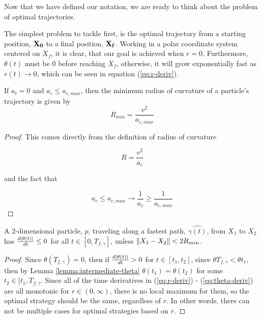 Now that we have defined our notation, we are ready to think about the problem of optimal trajectories.

The simplest problem to tackle first, is the optimal trajectory from a starting position, $\mathbf{X_0}$ to a final position, $\mathbf{X_f}$. Working in a polar coordinate system centered on $X_f$, it is clear, that our goal is achieved when $r = 0$. Furthermore, $\theta(t)$ must be $0$ before reaching $X_f$, otherwise, it will grow exponentially fast as $r(t) \to 0$, which can be seen in equation (\ref{eq:r-deriv}).

\begin{lemma}
If $a_t=0$ and $a_c \le a_{c,max}$, then the minimum radius of curvature of a particle's trajectory is given by
\begin{equation}
R_{min} = \frac{v^2}{a_{c,max}}
\end{equation}
\end{lemma}

\begin{proof}
This comes directly from the definition of radius of curvature 

\[
R = \frac{v^2}{a_c}
\]

and the fact that 

\[
a_c \le a_{c,max} \to \frac{1}{a_c} \ge \frac{1}{a_{c,max}}
\]
\end{proof}

\begin{theorem}
A 2-dimensional particle, $p$, traveling along a fastest path, $\hat{\gamma(t)}$, from $X_1$ to $X_2$ has $\frac{d\abs{\theta(t)}}{dt} \leq 0$ for all $t \in [0, T_{f, \gamma}]$, unless $\norm{X_1 - X_2} < 2 R_{min}$.
\end{theorem}

\begin{proof}
Since $\theta(T_{f,\gamma}) = 0$, then if $\frac{d\abs{\theta(t)}}{dt} > 0$ for $t \in [t_1, t_2]$, since $\theta{T_{f,\gamma}} < \theta{t_1}$, then by Lemma \ref{lemma:intermediate-theta} $\theta(t_1) = \theta(t_2)$ for some $t_2 \in [t_1, T_{f, \gamma}$. Since all of the time derivatives in (\ref{eq:r-deriv}) - (\ref{eq:theta-deriv}) are all monotonic for $r \in (0, \infty)$, there is no local maximum for them, so the optimal strategy should be the same, regardless of $r$. In other words, there can not be multiple cases for optimal strategies based on $r$.
\end{proof}


